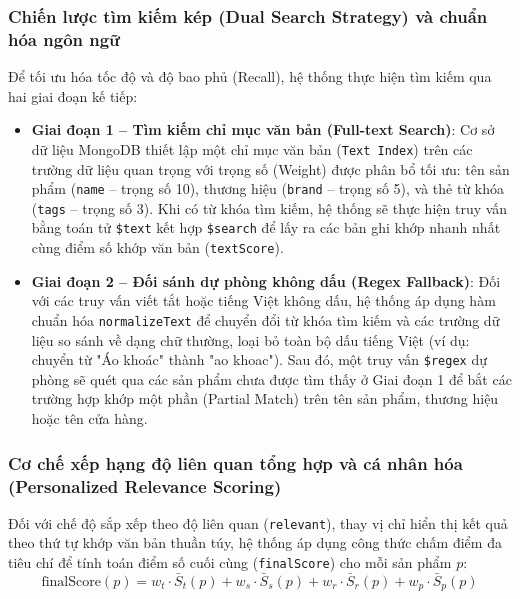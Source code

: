 \documentclass[../DoAn.tex]{subfiles}
\begin{document}
\subsubsection{Chiến lược tìm kiếm kép (Dual Search Strategy) và chuẩn hóa ngôn ngữ}
Để tối ưu hóa tốc độ và độ bao phủ (Recall), hệ thống thực hiện tìm kiếm qua hai giai đoạn kế tiếp:
\begin{itemize}
    \item \textbf{Giai đoạn 1 -- Tìm kiếm chỉ mục văn bản (Full-text Search)}: Cơ sở dữ liệu MongoDB thiết lập một chỉ mục văn bản (\texttt{Text Index}) trên các trường dữ liệu quan trọng với trọng số (Weight) được phân bổ tối ưu: tên sản phẩm (\texttt{name} -- trọng số 10), thương hiệu (\texttt{brand} -- trọng số 5), và thẻ từ khóa (\texttt{tags} -- trọng số 3). Khi có từ khóa tìm kiếm, hệ thống sẽ thực hiện truy vấn bằng toán tử \texttt{\$text} kết hợp \texttt{\$search} để lấy ra các bản ghi khớp nhanh nhất cùng điểm số khớp văn bản (\texttt{textScore}).
    \item \textbf{Giai đoạn 2 -- Đối sánh dự phòng không dấu (Regex Fallback)}: Đối với các truy vấn viết tắt hoặc tiếng Việt không dấu, hệ thống áp dụng hàm chuẩn hóa \texttt{normalizeText} để chuyển đổi từ khóa tìm kiếm và các trường dữ liệu so sánh về dạng chữ thường, loại bỏ toàn bộ dấu tiếng Việt (ví dụ: chuyển từ "Áo khoác" thành "ao khoac"). Sau đó, một truy vấn \texttt{\$regex} dự phòng sẽ quét qua các sản phẩm chưa được tìm thấy ở Giai đoạn 1 để bắt các trường hợp khớp một phần (Partial Match) trên tên sản phẩm, thương hiệu hoặc tên cửa hàng.
\end{itemize}

\subsubsection{Cơ chế xếp hạng độ liên quan tổng hợp và cá nhân hóa (Personalized Relevance Scoring)}
Đối với chế độ sắp xếp theo độ liên quan (\texttt{relevant}), thay vị chỉ hiển thị kết quả theo thứ tự khớp văn bản thuần túy, hệ thống áp dụng công thức chấm điểm đa tiêu chí để tính toán điểm số cuối cùng (\texttt{finalScore}) cho mỗi sản phẩm $p$:
\begin{equation}
    \text{finalScore}(p) = w_{t} \cdot \bar{S}_{t}(p) + w_{s} \cdot \bar{S}_{s}(p) + w_{r} \cdot \bar{S}_{r}(p) + w_{p} \cdot \bar{S}_{p}(p)
\end{equation}
\end{document}
